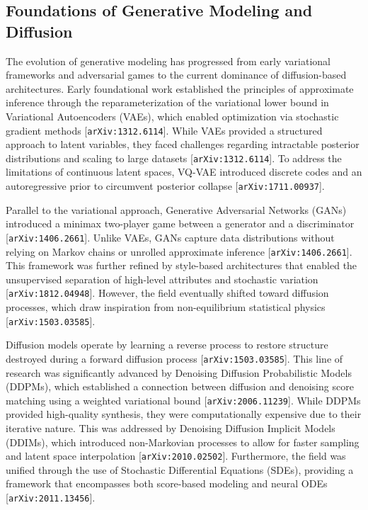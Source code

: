 \documentclass[11pt]{article}
\begin{document}
\subsection{Foundations of Generative Modeling and Diffusion}

The evolution of generative modeling has progressed from early variational frameworks and adversarial games to the current dominance of diffusion-based architectures. Early foundational work established the principles of approximate inference through the reparameterization of the variational lower bound in Variational Autoencoders (VAEs), which enabled optimization via stochastic gradient methods [\texttt{arXiv:1312.6114}]. While VAEs provided a structured approach to latent variables, they faced challenges regarding intractable posterior distributions and scaling to large datasets [\texttt{arXiv:1312.6114}]. To address the limitations of continuous latent spaces, VQ-VAE introduced discrete codes and an autoregressive prior to circumvent posterior collapse [\texttt{arXiv:1711.00937}].

Parallel to the variational approach, Generative Adversarial Networks (GANs) introduced a minimax two-player game between a generator and a discriminator [\texttt{arXiv:1406.2661}]. Unlike VAEs, GANs capture data distributions without relying on Markov chains or unrolled approximate inference [\texttt{arXiv:1406.2661}]. This framework was further refined by style-based architectures that enabled the unsupervised separation of high-level attributes and stochastic variation [\texttt{arXiv:1812.04948}]. However, the field eventually shifted toward diffusion processes, which draw inspiration from non-equilibrium statistical physics [\texttt{arXiv:1503.03585}].

Diffusion models operate by learning a reverse process to restore structure destroyed during a forward diffusion process [\texttt{arXiv:1503.03585}]. This line of research was significantly advanced by Denoising Diffusion Probabilistic Models (DDPMs), which established a connection between diffusion and denoising score matching using a weighted variational bound [\texttt{arXiv:2006.11239}]. While DDPMs provided high-quality synthesis, they were computationally expensive due to their iterative nature. This was addressed by Denoising Diffusion Implicit Models (DDIMs), which introduced non-Markovian processes to allow for faster sampling and latent space interpolation [\texttt{arXiv:2010.02502}]. Furthermore, the field was unified through the use of Stochastic Differential Equations (SDEs), providing a framework that encompasses both score-based modeling and neural ODEs [\texttt{arXiv:2011.13456}].
\end{document}
